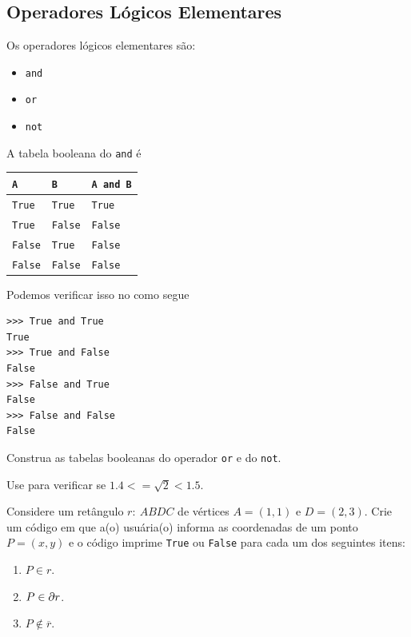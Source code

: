 \documentclass[12pt]{article}
\begin{document}
\subsection{Operadores Lógicos Elementares}

Os operadores lógicos elementares são:
\begin{itemize}
\item[]\lstinline+and+ 
\item[]\lstinline+or+ 
\item[]\lstinline+not+ 
\end{itemize}

\begin{ex}
  A tabela booleana{\boole} do \verb+and+ é
  \begin{center}
    \begin{tabular}[H]{ll|l}
      {\lstinline+A+} & {\lstinline+B+} &  {\lstinline+A and B+}\\\hline
      {\lstinline+True+} & {\lstinline+True+} & {\lstinline+True+} \\
      {\lstinline+True+} & {\lstinline+False+} & {\lstinline+False+} \\
      {\lstinline+False+} & {\lstinline+True+} & {\lstinline+False+} \\
      {\lstinline+False+} & {\lstinline+False+} & {\lstinline+False+} \\\hline
    \end{tabular}
  \end{center}
  Podemos verificar isso no {\python} como segue

\begin{lstlisting}
>>> True and True
True
>>> True and False
False
>>> False and True
False
>>> False and False
False
\end{lstlisting}

\end{ex}

\begin{exr}
  Construa as tabelas booleanas do operador \lstinline+or+ e do \lstinline+not+.
\end{exr}

\begin{exr}
  Use {\python} para verificar se $1.4 <= \sqrt{2} < 1.5$.
\end{exr}

\begin{exr}
  Considere um retângulo $r: ~ABDC$ de vértices $A = (1, 1)$ e $D = (2, 3)$. Crie um código em que a(o) usuária(o) informa as coordenadas de um ponto $P = (x, y)$ e o código imprime \lstinline+True+ ou \lstinline+False+ para cada um dos seguintes itens:
  \begin{enumerate}
  \item $P\in r$.
  \item $P\in \partial r$.
  \item $P\not\in \overline{r}$.
  \end{enumerate}
\end{exr}
\end{document}
